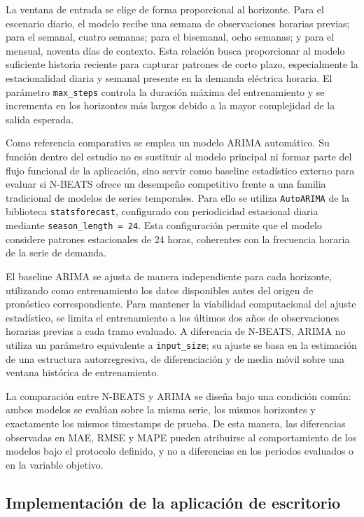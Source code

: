 La ventana de entrada se elige de forma proporcional al horizonte. Para el escenario diario, el modelo recibe una semana de observaciones horarias previas; para el semanal, cuatro semanas; para el bisemanal, ocho semanas; y para el mensual, noventa días de contexto. Esta relación busca proporcionar al modelo suficiente historia reciente para capturar patrones de corto plazo, especialmente la estacionalidad diaria y semanal presente en la demanda eléctrica horaria. El parámetro \texttt{max\_steps} controla la duración máxima del entrenamiento y se incrementa en los horizontes más largos debido a la mayor complejidad de la salida esperada.

Como referencia comparativa se emplea un modelo ARIMA automático. Su función dentro del estudio no es sustituir al modelo principal ni formar parte del flujo funcional de la aplicación, sino servir como baseline estadístico externo para evaluar si N-BEATS ofrece un desempeño competitivo frente a una familia tradicional de modelos de series temporales. Para ello se utiliza \texttt{AutoARIMA} de la biblioteca \texttt{statsforecast}, configurado con periodicidad estacional diaria mediante \texttt{season\_length = 24}. Esta configuración permite que el modelo considere patrones estacionales de 24 horas, coherentes con la frecuencia horaria de la serie de demanda.

El baseline ARIMA se ajusta de manera independiente para cada horizonte, utilizando como entrenamiento los datos disponibles antes del origen de pronóstico correspondiente. Para mantener la viabilidad computacional del ajuste estadístico, se limita el entrenamiento a los últimos dos años de observaciones horarias previas a cada tramo evaluado. A diferencia de N-BEATS, ARIMA no utiliza un parámetro equivalente a \texttt{input\_size}; su ajuste se basa en la estimación de una estructura autorregresiva, de diferenciación y de media móvil sobre una ventana histórica de entrenamiento.

La comparación entre N-BEATS y ARIMA se diseña bajo una condición común: ambos modelos se evalúan sobre la misma serie, los mismos horizontes y exactamente los mismos timestamps de prueba. De esta manera, las diferencias observadas en MAE, RMSE y MAPE pueden atribuirse al comportamiento de los modelos bajo el protocolo definido, y no a diferencias en los periodos evaluados o en la variable objetivo.

\subsection{Implementación de la aplicación de escritorio}

